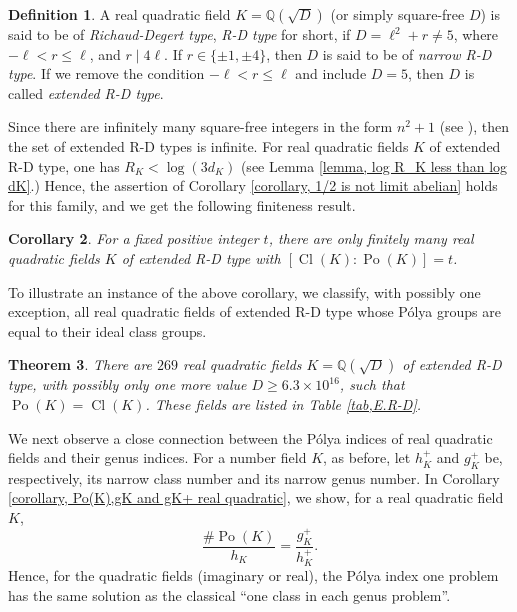 \documentclass[12pt]{amsart}
\newtheorem{theorem}{Theorem}[section]
\newtheorem{corollary}[theorem]{Corollary}
\theoremstyle{definition}
\newtheorem{definition}[theorem]{Definition}
\numberwithin{equation}{section}
\DeclareMathOperator{\Po}{Po}
\DeclareMathOperator{\Cl}{Cl}
\begin{document}
{\begin{definition} 
A real quadratic field $K=\mathbb{Q}(\sqrt{D})$ (or simply square-free $D$) is said to be of \emph{Richaud-Degert type}, \emph{R-D type} for short, if $D=\ell^2+r \neq 5$, where $ - \ell < r \leq \ell$, and $r \mid 4 \ell$. If $r \in \{ \pm 1, \pm 4\}$, then $D$ is said to be of \emph{narrow R-D type}. If we remove the condition  $ - \ell < r \leq \ell$ and include $D=5$, 
then $D$ is called \emph{extended R-D type}.
\end{definition}
}
Since there are infinitely many square-free integers in the form $n^2+1$  (see \cite{Nagel}), then the set of extended R-D types is infinite.
For real quadratic fields $K$ of extended R-D type, one has $R_K < \log (3 d_K)$ (see Lemma \ref{lemma, log R_K less than log dK}.) Hence, the assertion of Corollary \ref{corollary, 1/2 is not limit abelian} holds for this family, and we get the following finiteness result.

\begin{corollary} 
\label{theorem,RD}
For a fixed positive integer $t$, there are only finitely many real quadratic fields $K$ of extended R-D type with  $\left[\Cl(K): \Po(K)\right]=t$. 
\end{corollary}

To illustrate an instance of the above corollary, we classify, with possibly one exception, all real quadratic fields of extended R-D type whose P\'olya groups are equal to their ideal class groups.


\begin{theorem}
\label{theorem, finiteness Extended R-D type}
	There are $269$ real quadratic fields $K=\mathbb{Q}(\sqrt{D})$ of extended R-D type, with possibly only one more
	value $D \geq 6.3 \times 10^{16}$, such that $\Po(K)=\Cl(K)$. These fields are listed in Table \ref{tab,E.R-D}.
\end{theorem}


We next observe a close connection between the P\'olya indices of real quadratic fields and their genus indices. For a number field $K$, as before, let $h_K^+$ and $g_K^+$ be, respectively,  its narrow class number and its narrow genus number. 
In {Corollary} \ref{corollary, Po(K),gK and gK+ real quadratic}, we show, for a real quadratic field $K$,
\begin{equation}
\label{index relation}
\frac{\# \Po(K)}{h_K}=\frac{g_K^+}{h_K^+}.
\end{equation}
Hence, for the quadratic fields (imaginary or real), the P\'{o}lya index one problem has the same solution as the classical ``one class in each genus problem''.
\end{document}
